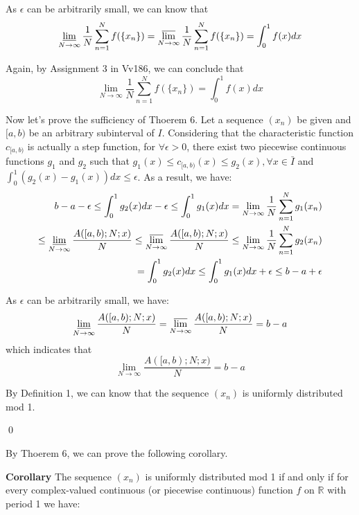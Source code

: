 \documentclass[12pt]{article}
\begin{document}
\par As $\epsilon$ can be arbitrarily small, we can know that 
\begin{equation*}
\varliminf_{N\to\infty}\frac{1}{N}\sum_{n=1}^{N}f(\{x_n\})= \varlimsup_{N\to \infty}\frac{1}{N}\sum_{n=1}^{N}f(\{x_n\}) =\int_{0}^{1}f(x)dx
\end{equation*}
\par Again, by Assignment 3 in Vv186, we can conclude that 
\begin{equation*}
\lim_{N\to\infty}\frac{1}{N}\sum_{n=1}^{N}f(\{x_n\})=\int_{0}^{1}f(x)dx
\end{equation*}
\par Now let's prove the sufficiency of Thoerem 6. Let a sequence $(x_n)$ be given and $[a,b)$ be an arbitrary subinterval of $I$. Considering that the characteristic function $c_{[a,b)}$ is actually a step function, for $\forall \epsilon >0$, there exist two piecewise continuous functions $g_1$ and $g_2$ such that $g_1(x)\leq c_{[a,b)}(x)\leq g_2(x), \forall x\in \bar{I}$ and $\int_{0}^{1}(g_2(x)-g_1(x))dx\leq\epsilon$. As a result, we have:
\[
\begin{split}
b-a-\epsilon\leq \int_{0}^{1}g_2(x)dx-\epsilon\leq \int_{0}^{1}g_1(x)dx=\lim_{N\to\infty}\frac{1}{N}\sum_{n=1}^{N}g_1({x_n})\\
\leq \varliminf_{N\to\infty}\frac{A([a,b);N;x)}{N}\leq \varlimsup_{N\to\infty}\frac{A([a,b);N;x)}{N}\leq \lim_{N\to\infty}\frac{1}{N}\sum_{n=1}^{N}g_2({x_n})\\
=\int_{0}^{1}g_2(x)dx\leq \int_{0}^{1}g_1(x)dx+\epsilon\leq b-a+\epsilon
\end{split}
\]
\par As $\epsilon$ can be arbitrarily small, we have:
\begin{equation*}
\varliminf_{N\to\infty}\frac{A([a,b);N;x)}{N}= \varlimsup_{N\to\infty}\frac{A([a,b);N;x)}{N}=b-a
\end{equation*}
which indicates that
\begin{equation*}
\lim_{N\to\infty}\frac{A([a,b);N;x)}{N}=b-a
\end{equation*}
\par By Definition 1, we can know that the sequence $(x_n)$ is uniformly distributed mod 1. 
\par \qed
\par By Thoerem 6, we can prove the following corollary.
\par {\textbf{Corollary}} The sequence $(x_n)$ is uniformly distributed mod 1 if and only if for every complex-valued continuous (or piecewise continuous) function $f$ on $\mathbb{R}$ with period 1 we have:
\end{document}
